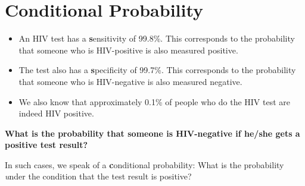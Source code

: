 \documentclass[twoside,11pt,a4paper]{article}
\newif\ifEN \ENtrue	                %
\def\tr|#1|#2|{\ifEN #2\else #1\fi}     %
\def\vsp{\vspace{5mm}}
\theoremstyle{definition}
\begin{document}
\section{\tr|Bedingte Wahrscheinlichkeit|Conditional Probability|}\label{cond}

\begin{itemize}
\item
  \tr|Ein HIV Test hat eine \textbf{Sensitivität} von 99.8\%.
  Dies ist die Wahrscheinlichkeit, dass jemand, der HIV-positiv ist auch positiv getestet wird. 
  |An HIV test has a \textbf{sensitivity} of 99.8\%.  
  This corresponds to the probability that someone who is HIV-positive is also measured positive. |
\item
  \tr|Der Test hat eine \textbf{Spezifität} von 99.7\%. 
  Die ist die Wahrscheinlichkeit, dass jemand der HIV-negativ ist auch negativ getest wird.
  |The test also has a \textbf{specificity} of 99.7\%. 
  This corresponds to the probability that someone who is HIV-negative is also measured negative.|
\item
  \tr|Wir wissen auch, dass etwa 0.1\% der Personen, die einen  HIV test machen tatsächlich HIV positiv sind. 
  |We also know that approximately 0.1\% of people who do the HIV test are indeed HIV positive.|
\end{itemize}

\vsp

\textbf{\tr|Wie gross ist die Wahrscheinlichkeit, dass jemand HIV positiv ist, wenn er ein positives Testresultat hat. 
  |What is the probability that someone is HIV-negative if he/she gets a positive test result?| }

\vsp
\tr|In solchen Fällen sprechen wir von \textbf{bedingter Wahrscheinlichkeit}: Wie gross ist eine Wahrscheinlichkeit 
\emph{unter der Bedingung}, dass das Testresultat positiv ist. 
|In such cases, we speak of a \textbf{conditional probability}: 
What is the probability \textit{under the condition} that the test result is positive?|
\vsp
\end{document}
